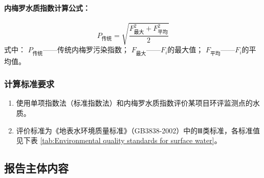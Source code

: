 \paragraph*{内梅罗水质指数计算公式：}
\begin{equation} \label{eq:Nemero Water Quality Index}
    P_{\text{传统}} = \sqrt{\dfrac{F_{\text{最大}}^2+F_{\text{平均}}^2}{2}}
\end{equation}
式中：
$P_{\text{传统}}$——传统内梅罗污染指数；
\newline\phantom{式中：}$F_{\text{最大}}$——$F_i$的最大值；
\newline\phantom{式中：}$F_{\text{平均}}$——$F_i$的平均值。


\subsubsection{计算标准要求}

\begin{enumerate}
    \item 使用单项指数法（标准指数法）和内梅罗水质指数评价某项目环评监测点的水质。
    \item 评价标准为《地表水环境质量标准》（GB3838-2002）中的Ⅲ类标准，各标准值见下表 \ref{tab:Environmental quality standards for surface water}。
\end{enumerate}

\begin{table}[H]
    \centering
    \caption{地表水环境质量标准\cite{GB3838-2002}}
    \label{tab:Environmental quality standards for surface water}%
\end{table}


\subsection{报告主体内容}
